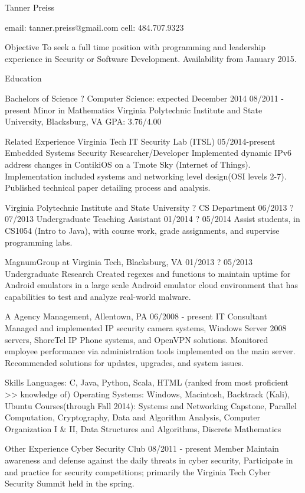 \documentclass{article}
\begin{document}
Tanner Preiss

email: tanner.preiss@gmail.com
cell: 484.707.9323

Objective   To seek a full time position with programming and leadership experience in Security or Software Development.
Availability from January 2015.

Education

Bachelors of Science ? Computer Science: expected December 2014 	                                 08/2011 - present
	Minor in Mathematics
	Virginia Polytechnic Institute and State University, Blacksburg, VA
	GPA: 3.76/4.00     			

Related Experience
Virginia Tech IT Security Lab (ITSL) 			             05/2014-present
Embedded Systems Security Researcher/Developer
Implemented dynamic IPv6 address changes in ContikiOS on a Tmote Sky (Internet of Things). Implementation included systems and networking level design(OSI levels 2-7). Published technical paper detailing process and analysis. 

Virginia Polytechnic Institute and State University ? CS Department 			         06/2013 ? 07/2013
Undergraduate Teaching Assistant			         01/2014 ? 05/2014
Assist students, in CS1054 (Intro to Java), with course work, grade assignments, and supervise programming labs.

MagnumGroup at Virginia Tech, Blacksburg, VA			         01/2013 ? 05/2013
Undergraduate Research 
Created regexes and functions to maintain uptime for Android emulators in a large scale Android emulator cloud environment that has capabilities to test and analyze real-world malware.

A Agency Management, Allentown, PA			           06/2008 - present
IT Consultant
Managed and implemented IP security camera systems, Windows Server 2008 servers, ShoreTel IP Phone systems, and OpenVPN solutions. Monitored employee performance via administration tools implemented on    the main server. Recommended solutions for updates, upgrades, and system issues.

Skills
Languages: C, Java, Python, Scala, HTML (ranked from most proficient >> knowledge of)
Operating Systems: Windows, Macintosh, Backtrack (Kali), Ubuntu
Courses(through Fall 2014):    Systems and Networking Capstone, Parallel Computation, Cryptography, Data and Algorithm Analysis, Computer Organization I \& II, Data Structures and Algorithms, Discrete Mathematics

Other Experience
Cyber Security Club			           08/2011 - present
Member
Maintain awareness and defense against the daily threats in cyber security, Participate in and practice for security competitions; primarily the Virginia Tech Cyber Security Summit held in the spring.
\end{document}
